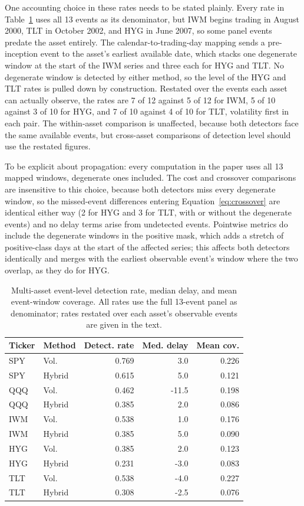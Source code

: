\documentclass[pdflatex,sn-mathphys-num,iicol]{sn-jnl}
\begin{document}
One accounting choice in these rates needs to be stated plainly. Every rate in Table~\ref{tab:multiasset_event_level} uses all 13 events as its denominator, but IWM begins trading in August 2000, TLT in October 2002, and HYG in June 2007, so some panel events predate the asset entirely. The calendar-to-trading-day mapping sends a pre-inception event to the asset's earliest available date, which stacks one degenerate window at the start of the IWM series and three each for HYG and TLT. No degenerate window is detected by either method, so the level of the HYG and TLT rates is pulled down by construction. Restated over the events each asset can actually observe, the rates are 7 of 12 against 5 of 12 for IWM, 5 of 10 against 3 of 10 for HYG, and 7 of 10 against 4 of 10 for TLT, volatility first in each pair. The within-asset comparison is unaffected, because both detectors face the same available events, but cross-asset comparisons of detection level should use the restated figures.

To be explicit about propagation: every computation in the paper uses all 13 mapped windows, degenerate ones included. The cost and crossover comparisons are insensitive to this choice, because both detectors miss every degenerate window, so the missed-event differences entering Equation~\eqref{eq:crossover} are identical either way (2 for HYG and 3 for TLT, with or without the degenerate events) and no delay terms arise from undetected events. Pointwise metrics do include the degenerate windows in the positive mask, which adds a stretch of positive-class days at the start of the affected series; this affects both detectors identically and merges with the earliest observable event's window where the two overlap, as they do for HYG.

\begin{table}[t]
\centering
\caption{Multi-asset event-level detection rate, median delay, and mean event-window coverage. All rates use the full 13-event panel as denominator; rates restated over each asset's observable events are given in the text.}
\label{tab:multiasset_event_level}
\scriptsize
\begin{tabular}{llrrr}
\toprule
Ticker & Method & Detect. rate & Med. delay & Mean cov.\\
\midrule
SPY & Vol. & 0.769 & 3.0 & 0.226\\
SPY & Hybrid & 0.615 & 5.0 & 0.121\\
QQQ & Vol. & 0.462 & -11.5 & 0.198\\
QQQ & Hybrid & 0.385 & 2.0 & 0.086\\
IWM & Vol. & 0.538 & 1.0 & 0.176\\
IWM & Hybrid & 0.385 & 5.0 & 0.090\\
HYG & Vol. & 0.385 & 2.0 & 0.123\\
HYG & Hybrid & 0.231 & -3.0 & 0.083\\
TLT & Vol. & 0.538 & -4.0 & 0.227\\
TLT & Hybrid & 0.308 & -2.5 & 0.076\\
\bottomrule
\end{tabular}
\end{table}
\end{document}
